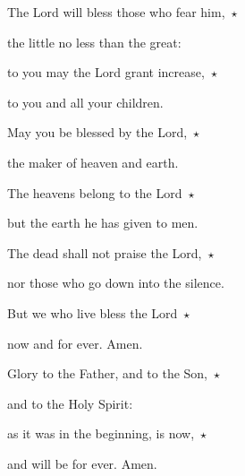 \noindent The Lord will bless those who fear him,~$\star$~\nopagebreak

the little no less than the great:

\noindent to you may the Lord grant increase,~$\star$~\nopagebreak

to you and all your children.



\noindent May you be blessed by the Lord,~$\star$~\nopagebreak

the maker of heaven and earth.

\noindent The heavens belong to the Lord~$\star$~\nopagebreak

but the earth he has given to men.



\noindent The dead shall not praise the Lord,~$\star$~\nopagebreak

nor those who go down into the silence.

\noindent But we who live bless the Lord~$\star$~\nopagebreak

now and for ever. Amen.



\noindent Glory to the Father, and to the Son,~$\star$~\nopagebreak

and to the Holy Spirit:

\noindent as it was in the beginning, is now,~$\star$~\nopagebreak

and will be for ever. Amen.
